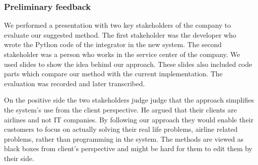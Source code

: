 \subsubsection{Preliminary feedback}
We performed a presentation with two key stakeholders of the company to evaluate our suggested method. The first stakeholder was the developer who wrote the Python code of the integrator in the new system. The second stakeholder was a person who works in the service center of the company. 
We used slides to show the idea behind our approach. These slides also included code parts which compare our method with the current implementation. The evaluation was recorded and later transcribed. %


%
%

On the positive side the two stakeholders judge judge that the approach simplifies the system's use from the client
perspective. He argued that their clients are airlines and not IT companies.
By following our approach they would enable their customers to focus on actually solving their real life problems, airline related problems, rather than programming in the system. The methods are viewed as black boxes from client's perspective and might be hard for them to edit them by their side.

